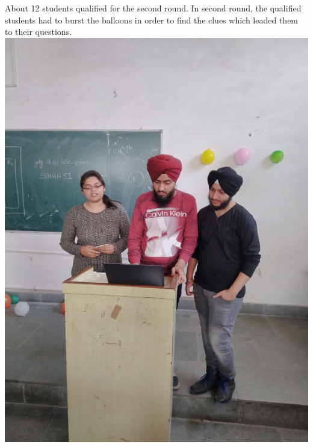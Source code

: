 \documentclass[12pt, a4 paper]{article}
\begin{document}
\begin{center}
\begin{Large}
\bigskip

\begin{multicols}{2}
 About 12 students qualified for the second round. In second round, the qualified students had to burst the balloons in order to find the clues which leaded them to their questions. 
\columnbreak
\includegraphics[width=\linewidth]{image2.png}
  
\end{multicols}

\newpage


\end{Large}
\end{center}
\end{document}
